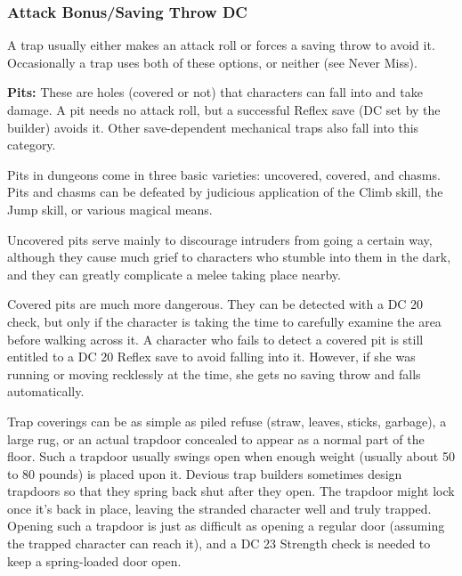 \subsubsection{Attack Bonus/Saving Throw DC}
A trap usually either makes an attack roll or forces a saving throw to avoid it. Occasionally a trap uses both of these options, or neither (see Never Miss).

\textbf{Pits:} These are holes (covered or not) that characters can fall into and take damage. A pit needs no attack roll, but a successful Reflex save (DC set by the builder) avoids it. Other save-dependent mechanical traps also fall into this category.

Pits in dungeons come in three basic varieties: uncovered, covered, and chasms. Pits and chasms can be defeated by judicious application of the Climb skill, the Jump skill, or various magical means.

Uncovered pits serve mainly to discourage intruders from going a certain way, although they cause much grief to characters who stumble into them in the dark, and they can greatly complicate a melee taking place nearby.

Covered pits are much more dangerous. They can be detected with a DC 20  check, but only if the character is taking the time to carefully examine the area before walking across it. A character who fails to detect a covered pit is still entitled to a DC 20 Reflex save to avoid falling into it. However, if she was running or moving recklessly at the time, she gets no saving throw and falls automatically.

Trap coverings can be as simple as piled refuse (straw, leaves, sticks, garbage), a large rug, or an actual trapdoor concealed to appear as a normal part of the floor. Such a trapdoor usually swings open when enough weight (usually about 50 to 80 pounds) is placed upon it. Devious trap builders sometimes design trapdoors so that they spring back shut after they open. The trapdoor might lock once it's back in place, leaving the stranded character well and truly trapped. Opening such a trapdoor is just as difficult as opening a regular door (assuming the trapped character can reach it), and a DC 23 Strength check is needed to keep a spring-loaded door open.

